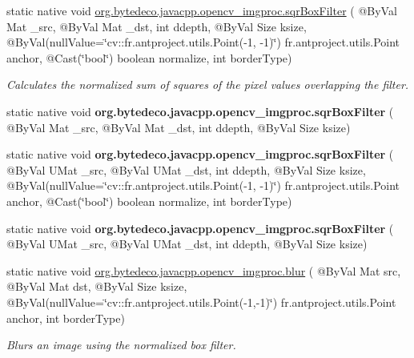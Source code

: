 \begin{DoxyCompactItemize}
\item 
static native void \hyperlink{group__imgproc__filter_gac3bb5f90c81da13be223978755c103e2}{org.\+bytedeco.\+javacpp.\+opencv\+\_\+imgproc.\+sqr\+Box\+Filter} ( @By\+Val Mat \+\_\+src, @By\+Val Mat \+\_\+dst, int ddepth, @By\+Val Size ksize, @By\+Val(null\+Value=\char`\"{}cv\+::\+fr.antproject.utils.Point(-\/1, -\/1)\char`\"{}) fr.antproject.utils.Point anchor, @Cast(\char`\"{}bool\char`\"{}) boolean normalize, int border\+Type)
\begin{DoxyCompactList}\small\item\em Calculates the normalized sum of squares of the pixel values overlapping the filter. \end{DoxyCompactList}\item 
\mbox{\label{group__imgproc__filter_gac69e2c5aa5aa8e1b1bf2ded1097813f1}} 
static native void {\bfseries org.\+bytedeco.\+javacpp.\+opencv\+\_\+imgproc.\+sqr\+Box\+Filter} ( @By\+Val Mat \+\_\+src, @By\+Val Mat \+\_\+dst, int ddepth, @By\+Val Size ksize)
\item 
\mbox{\label{group__imgproc__filter_gae438b3dd3418a0a16ebe6ccab65f8260}} 
static native void {\bfseries org.\+bytedeco.\+javacpp.\+opencv\+\_\+imgproc.\+sqr\+Box\+Filter} ( @By\+Val U\+Mat \+\_\+src, @By\+Val U\+Mat \+\_\+dst, int ddepth, @By\+Val Size ksize, @By\+Val(null\+Value=\char`\"{}cv\+::\+fr.antproject.utils.Point(-\/1, -\/1)\char`\"{}) fr.antproject.utils.Point anchor, @Cast(\char`\"{}bool\char`\"{}) boolean normalize, int border\+Type)
\item 
\mbox{\label{group__imgproc__filter_gae60998a04ea1d80b4998496348eb7dda}} 
static native void {\bfseries org.\+bytedeco.\+javacpp.\+opencv\+\_\+imgproc.\+sqr\+Box\+Filter} ( @By\+Val U\+Mat \+\_\+src, @By\+Val U\+Mat \+\_\+dst, int ddepth, @By\+Val Size ksize)
\item 
static native void \hyperlink{group__imgproc__filter_ga2878e087c0294ad9e5f1996c07b303b4}{org.\+bytedeco.\+javacpp.\+opencv\+\_\+imgproc.\+blur} ( @By\+Val Mat src, @By\+Val Mat dst, @By\+Val Size ksize, @By\+Val(null\+Value=\char`\"{}cv\+::\+fr.antproject.utils.Point(-\/1,-\/1)\char`\"{}) fr.antproject.utils.Point anchor, int border\+Type)
\begin{DoxyCompactList}\small\item\em Blurs an image using the normalized box filter. \end{DoxyCompactList}\item 

\end{DoxyCompactItemize}
